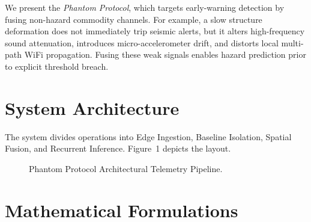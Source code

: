 \documentclass[conference]{IEEEtran}
\begin{document}
We present the \textit{Phantom Protocol}, which targets early-warning detection by fusing non-hazard commodity channels. For example, a slow structure deformation does not immediately trip seismic alerts, but it alters high-frequency sound attenuation, introduces micro-accelerometer drift, and distorts local multi-path WiFi propagation. Fusing these weak signals enables hazard prediction prior to explicit threshold breach.

\section{System Architecture}
The system divides operations into Edge Ingestion, Baseline Isolation, Spatial Fusion, and Recurrent Inference. Figure~1 depicts the layout.

\begin{figure}[h]
\centering
{}
\caption{Phantom Protocol Architectural Telemetry Pipeline.}
\end{figure}

\section{Mathematical Formulations}
\end{document}
